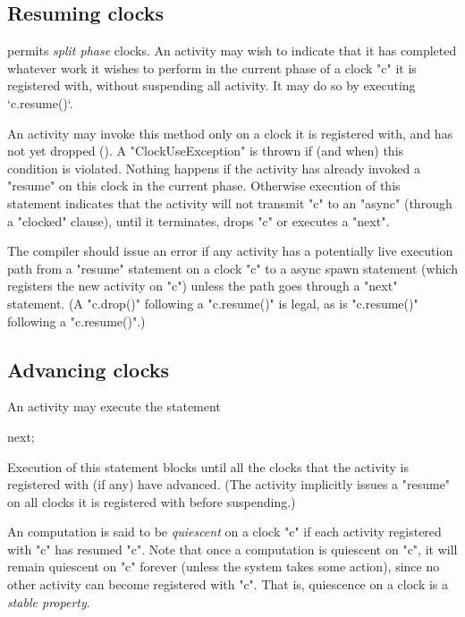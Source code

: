 \subsection{Resuming clocks}\label{resume}\label{sec:clock:resume}
\Xten{} permits {\em split phase} clocks. An activity may wish
to indicate that it has completed whatever work it wishes to perform
in the current phase of a  clock \xcd"c" it is registered with, without
suspending all activity. It may do so  by executing 
\xcd`c.resume()`.



An activity may invoke this method only on a clock it is registered
with, and has not yet dropped (). A \xcd"ClockUseException" is thrown if (and
when) this condition is violated.  Nothing happens if the activity has
already invoked a \xcd"resume" on this clock in the current phase.
Otherwise execution of this statement indicates that the activity will
not transmit \xcd"c" to an \xcd"async" (through a \xcd"clocked"
clause),
until it terminates, drops \xcd"c" or executes a \xcd"next". 

\begin{staticrule*}
The compiler should issue an error if any activity has a potentially
live execution path from a \xcd"resume" statement on a clock \xcd"c"
to a
async spawn statement (which registers the new
activity on \xcd"c") unless the path goes through a \xcd"next"
statement. (A \xcd"c.drop()" following a \xcd"c.resume()" is legal,
as is \xcd"c.resume()" following a \xcd"c.resume()".)
\end{staticrule*}

\subsection{Advancing clocks}\label{sec:clock:next}
An activity may execute the statement
\begin{xten}
next;
\end{xten}

\noindent 
Execution of this statement blocks until all the clocks that the
activity is registered with (if any) have advanced. (The activity
implicitly issues a \xcd"resume" on all clocks it is registered
with before suspending.)

An \Xten{} computation is said to be {\em quiescent} on a clock
\xcd"c" if each activity registered with \xcd"c" has resumed \xcd"c".
Note that once a computation is quiescent on \xcd"c", it will remain
quiescent on \xcd"c" forever (unless the system takes some action),
since no other activity can become registered with \xcd"c".  That is,
quiescence on a clock is a {\em stable property}.

